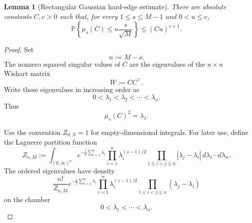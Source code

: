\documentclass[11pt]{article}
\newtheorem{lemma}{Lemma}
\newcommand{\Pbb}{\mathbb P}
\newcommand{\1}{\mathbf 1}
\begin{document}
\begin{lemma}[Rectangular Gaussian hard-edge estimate]
\label{lem:rectangular-gaussian-hard-edge}
There are absolute constants \(C,c>0\) such that, for every
\(1\le s\le M-1\) and \(0<u\le c\),
\begin{equation}
        \Pbb\left\{
        \mu_s(C)\le u\frac{s}{\sqrt M}
        \right\}
        \le
        (Cu)^{s+1}.
        \label{eq:rectangular-gaussian-hard-edge}
\end{equation}
\end{lemma}

\begin{proof}
Set
\[
        n:=M-s.
\]
The nonzero squared singular values of \(C\) are the eigenvalues of the \(n\times n\)
Wishart matrix
\[
        W:=CC^\top.
\]
Write these eigenvalues in increasing order as
\[
        0<\lambda_1<\lambda_2<\cdots<\lambda_n.
\]
Thus
\[
        \mu_s(C)^2=\lambda_1.
\]

Use the convention \(Z_{0,N}=1\) for empty-dimensional integrals.
For later use, define the Laguerre partition function
\[
        Z_{n,M}
        :=
        \int_{(0,\infty)^n}
        e^{-\frac12\sum_{i=1}^n\lambda_i}
        \prod_{i=1}^n\lambda_i^{(s-1)/2}
        \prod_{1\le i<j\le n}|\lambda_j-\lambda_i|
        \,d\lambda_1\cdots d\lambda_n.
\]
The ordered eigenvalues have density
\begin{equation}
        \frac{n!}{Z_{n,M}}
        e^{-\frac12\sum_{i=1}^n\lambda_i}
        \prod_{i=1}^n\lambda_i^{(s-1)/2}
        \prod_{1\le i<j\le n}(\lambda_j-\lambda_i)
        \label{eq:ordered-wishart-density}
\end{equation}
on the chamber
\[
        0<\lambda_1<\cdots<\lambda_n.
\]


\end{proof}
\end{document}
